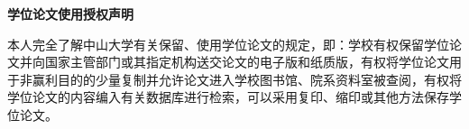 {%
\vspace*{60pt}
\begin{center}
  \sanhao\song\bfseries{学位论文使用授权声明}
\end{center}

\song{}
本人完全了解中山大学有关保留、使用学位论文的规定，即：学校有权保留学位论文并向国家主管部门或其指定机构送交论文的电子版和纸质版，有权将学位论文用于非赢利目的的少量复制并允许论文进入学校图书馆、院系资料室被查阅，有权将学位论文的内容编入有关数据库进行检索，可以采用复印、缩印或其他方法保存学位论文。

\vspace*{40pt}
\begin{center}
\setlength{\@title@width}{5cm}
  {\sihao{}
 }
\end{center}
\thispagestyle{empty}   %

\newpage
\thispagestyle{empty}   %
\mbox{}


\clearpage
\setcounter{page}{1}                    %


\begin{flushleft}
\setlength{\@title@width}{5cm}
  {\wuhao{}
 }
\end{flushleft}

}
